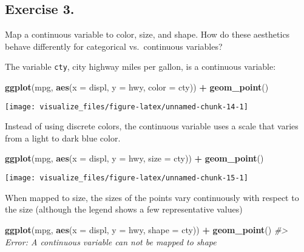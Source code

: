 \documentclass[]{book}
\newenvironment{Shaded}{\begin{snugshade}}{\end{snugshade}}
\newcommand{\CommentTok}[1]{\textcolor[rgb]{0.56,0.35,0.01}{\textit{#1}}}
\newcommand{\DataTypeTok}[1]{\textcolor[rgb]{0.13,0.29,0.53}{#1}}
\newcommand{\KeywordTok}[1]{\textcolor[rgb]{0.13,0.29,0.53}{\textbf{#1}}}
\newcommand{\NormalTok}[1]{#1}
\newcommand{\OperatorTok}[1]{\textcolor[rgb]{0.81,0.36,0.00}{\textbf{#1}}}
\newcommand{\StringTok}[1]{\textcolor[rgb]{0.31,0.60,0.02}{#1}}
\theoremstyle{definition}
\theoremstyle{definition}
\theoremstyle{definition}
\theoremstyle{remark}
\begin{document}
\hypertarget{exercise-3.-1}{%
\subsection{Exercise 3.}\label{exercise-3.-1}}

Map a continuous variable to color, size, and shape. How do these
aesthetics behave differently for categorical vs.~continuous variables?

The variable \texttt{cty}, city highway miles per gallon, is a
continuous variable:

\begin{Shaded}
\begin{Highlighting}[]
\KeywordTok{ggplot}\NormalTok{(mpg, }\KeywordTok{aes}\NormalTok{(}\DataTypeTok{x =}\NormalTok{ displ, }\DataTypeTok{y =}\NormalTok{ hwy, }\DataTypeTok{color =}\NormalTok{ cty)) }\OperatorTok{+}
\StringTok{  }\KeywordTok{geom_point}\NormalTok{()}
\end{Highlighting}
\end{Shaded}

\begin{center}\texttt{[image: visualize\_files/figure-latex/unnamed-chunk-14-1]} \end{center}

Instead of using discrete colors, the continuous variable uses a scale
that varies from a light to dark blue color.

\begin{Shaded}
\begin{Highlighting}[]
\KeywordTok{ggplot}\NormalTok{(mpg, }\KeywordTok{aes}\NormalTok{(}\DataTypeTok{x =}\NormalTok{ displ, }\DataTypeTok{y =}\NormalTok{ hwy, }\DataTypeTok{size =}\NormalTok{ cty)) }\OperatorTok{+}
\StringTok{  }\KeywordTok{geom_point}\NormalTok{()}
\end{Highlighting}
\end{Shaded}

\begin{center}\texttt{[image: visualize\_files/figure-latex/unnamed-chunk-15-1]} \end{center}

When mapped to size, the sizes of the points vary continuously with
respect to the size (although the legend shows a few representative
values)

\begin{Shaded}
\begin{Highlighting}[]
\KeywordTok{ggplot}\NormalTok{(mpg, }\KeywordTok{aes}\NormalTok{(}\DataTypeTok{x =}\NormalTok{ displ, }\DataTypeTok{y =}\NormalTok{ hwy, }\DataTypeTok{shape =}\NormalTok{ cty)) }\OperatorTok{+}
\StringTok{  }\KeywordTok{geom_point}\NormalTok{()}
\CommentTok{#> Error: A continuous variable can not be mapped to shape}
\end{Highlighting}
\end{Shaded}
\end{document}
